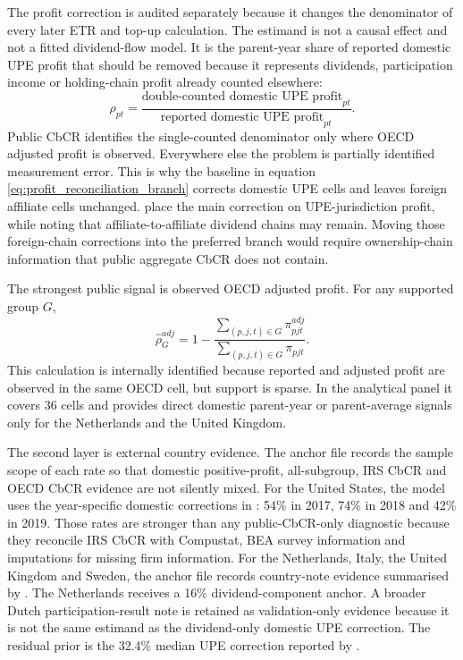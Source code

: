 \documentclass[11pt,a4paper]{article}
\begin{document}
The profit correction is audited separately because it changes the denominator of every later ETR and top-up calculation. The estimand is not a causal effect and not a fitted dividend-flow model. It is the parent-year share of reported domestic UPE profit that should be removed because it represents dividends, participation income or holding-chain profit already counted elsewhere:
\begin{equation}\label{eq:profit_reconciliation_estimand}
\rho_{pt}
=
\frac{\text{double-counted domestic UPE profit}_{pt}}
{\text{reported domestic UPE profit}_{pt}} .
\end{equation}
Public CbCR identifies the single-counted denominator only where OECD adjusted profit is observed. Everywhere else the problem is partially identified measurement error. This is why the baseline in equation \eqref{eq:profit_reconciliation_branch} corrects domestic UPE cells and leaves foreign affiliate cells unchanged. \citet{hugger2026} place the main correction on UPE-jurisdiction profit, while noting that affiliate-to-affiliate dividend chains may remain. Moving those foreign-chain corrections into the preferred branch would require ownership-chain information that public aggregate CbCR does not contain.

The strongest public signal is observed OECD adjusted profit. For any supported group $G$,
\[
\widehat{\rho}^{adj}_{G}
=1-
\frac{\sum_{(p,j,t)\in G}\pi^{adj}_{pjt}}
{\sum_{(p,j,t)\in G}\pi_{pjt}} .
\]
This calculation is internally identified because reported and adjusted profit are observed in the same OECD cell, but support is sparse. In the analytical panel it covers 36 cells and provides direct domestic parent-year or parent-average signals only for the Netherlands and the United Kingdom.

The second layer is external country evidence. The anchor file records the sample scope of each rate so that domestic positive-profit, all-subgroup, IRS CbCR and OECD CbCR evidence are not silently mixed. For the United States, the model uses the year-specific domestic corrections in \citet{garcia-bernardo2022a}: 54\% in 2017, 74\% in 2018 and 42\% in 2019. Those rates are stronger than any public-CbCR-only diagnostic because they reconcile IRS CbCR with Compustat, BEA survey information and imputations for missing firm information. For the Netherlands, Italy, the United Kingdom and Sweden, the anchor file records country-note evidence summarised by \citet{godar2024}. The Netherlands receives a 16\% dividend-component anchor. A broader Dutch participation-result note is retained as validation-only evidence because it is not the same estimand as the dividend-only domestic UPE correction. The residual prior is the 32.4\% median UPE correction reported by \citet{hugger2026}.
\end{document}
